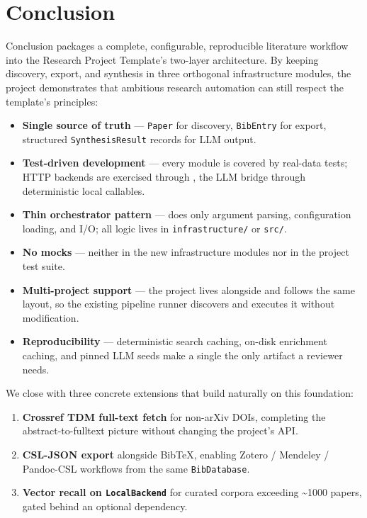 \documentclass[
  ignorenonframetext,
]{beamer}
\author{\texorpdfstring{}{}}
\date{}
\providecommand{\tightlist}{%
  \setlength{\itemsep}{0pt}\setlength{\parskip}{0pt}}
\begin{document}
\section{Conclusion}\label{sec:conclusion}

\begin{frame}{Conclusion}
 packages a complete, configurable,
reproducible literature workflow into the Research Project Template's
two-layer architecture. By keeping discovery, export, and synthesis in
three orthogonal infrastructure modules, the project demonstrates that
ambitious research automation can still respect the template's
principles:

\begin{itemize}
\tightlist
\item
  \textbf{Single source of truth} --- \texttt{Paper} for discovery,
  \texttt{BibEntry} for export, structured \texttt{SynthesisResult}
  records for LLM output.
\item
  \textbf{Test-driven development} --- every module is covered by
  real-data tests; HTTP backends are exercised through
  , the LLM bridge through deterministic local
  callables.
\item
  \textbf{Thin orchestrator pattern} ---
   does only argument parsing,
  configuration loading, and I/O; all logic lives in
  \texttt{infrastructure/} or \texttt{src/}.
\item
  \textbf{No mocks} --- neither in the new infrastructure modules nor in
  the project test suite.
\item
  \textbf{Multi-project support} --- the project lives alongside
   and follows the same layout, so the
  existing pipeline runner discovers and executes it without
  modification.
\item
  \textbf{Reproducibility} --- deterministic search caching, on-disk
  enrichment caching, and pinned LLM seeds make a single
   the only artifact a reviewer needs.
\end{itemize}

We close with three concrete extensions that build naturally on this
foundation:

\begin{enumerate}
\tightlist
\item
  \textbf{Crossref TDM full-text fetch} for non-arXiv DOIs, completing
  the abstract-to-fulltext picture without changing the project's API.
\item
  \textbf{CSL-JSON export} alongside BibTeX, enabling Zotero / Mendeley
  / Pandoc-CSL workflows from the same \texttt{BibDatabase}.
\item
  \textbf{Vector recall on \texttt{LocalBackend}} for curated corpora
  exceeding \textasciitilde1000 papers, gated behind an optional
  dependency.
\end{enumerate}


\end{frame}
\end{document}
